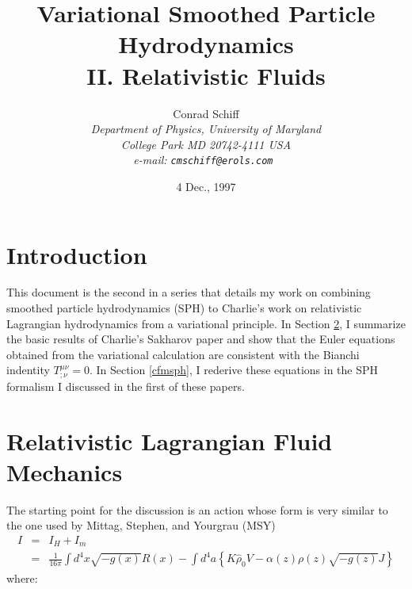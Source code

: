 


\title{Variational Smoothed Particle Hydrodynamics\\
	II. Relativistic Fluids}
%
\author{   \sc
            Conrad Schiff\\
           \em
            Department of Physics, University of Maryland%
           \\ \em
            College Park MD 20742-4111 USA\\
           \rm
         e-mail: \tt cmschiff@erols.com
        }
\date{4 Dec., 1997}
% 
\maketitle

\section{Introduction}

This document is the second in a series that details my work on combining smoothed particle hydrodynamics (SPH) to Charlie's work on relativistic Lagrangian hydrodynamics  from a variational principle.  In Section \ref{cfm}, I summarize the basic results of Charlie's Sakharov paper and show that the Euler equations obtained from the variational calculation are consistent with the Bianchi indentity $T^{\mu \nu}_{;\nu} = 0$.  In Section \ref{cfmsph}, I rederive these equations in the SPH formalism I discussed in the first of these papers.

\section{Relativistic Lagrangian Fluid Mechanics}\label{cfm}
The starting point for the discussion is an action whose form is very similar to the one used by Mittag, Stephen, and Yourgrau (MSY)
\begin{eqnarray}
I & = &  I_{H} + I_{m} \nonumber \\
& = &  \frac{1}{16 \pi} \int \! d^4x \sqrt{-g(x)} R(x) - \int \! d^4a \left \{K 
	{\hat \rho}_{0}	V - \alpha(z) \rho(z) \sqrt{-g(z)} J \right\}
\end{eqnarray}
where:

